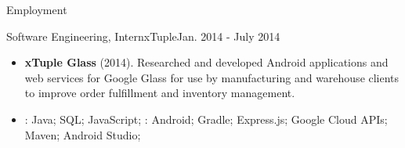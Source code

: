 \documentclass[]{mcdowellcv}
\begin{document}
\begin{cvsection}{Employment}
        \begin{cvsubsection}{Software Engineering, Intern}{xTuple}{Jan. 2014 - July 2014}
            \begin{itemize}
                \item \textbf{xTuple Glass} (2014). Researched and developed Android applications and web services for Google Glass for use by manufacturing and warehouse clients to improve order fulfillment and inventory management.
            \end{itemize}
            \begin{itemize}
                 \item {}: Java; SQL; JavaScript; \newline
                : Android; Gradle; Express.js; Google Cloud APIs; Maven; Android Studio;
            \end{itemize}
        \end{cvsubsection}

    \end{cvsection}
\end{document}
